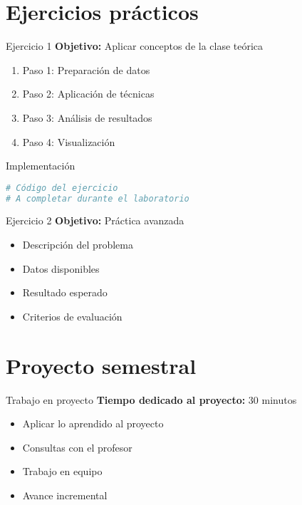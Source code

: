 \documentclass[10pt]{beamer}
\begin{document}
\section{Ejercicios prácticos}

\begin{frame}{Ejercicio 1}
    \textbf{Objetivo:} Aplicar conceptos de la clase teórica
    
    \begin{enumerate}
        \item Paso 1: Preparación de datos
        \item Paso 2: Aplicación de técnicas
        \item Paso 3: Análisis de resultados
        \item Paso 4: Visualización
    \end{enumerate}
\end{frame}

\begin{frame}[fragile]{Implementación}
    \begin{lstlisting}[language=R]
# Código del ejercicio
# A completar durante el laboratorio
    \end{lstlisting}
\end{frame}

\begin{frame}{Ejercicio 2}
    \textbf{Objetivo:} Práctica avanzada
    
    \begin{itemize}
        \item Descripción del problema
        \item Datos disponibles
        \item Resultado esperado
        \item Criterios de evaluación
    \end{itemize}
\end{frame}

\section{Proyecto semestral}

\begin{frame}{Trabajo en proyecto}
    \textbf{Tiempo dedicado al proyecto:} 30 minutos
    
    \begin{itemize}
        \item Aplicar lo aprendido al proyecto
        \item Consultas con el profesor
        \item Trabajo en equipo
        \item Avance incremental
    \end{itemize}
\end{frame}
\end{document}
